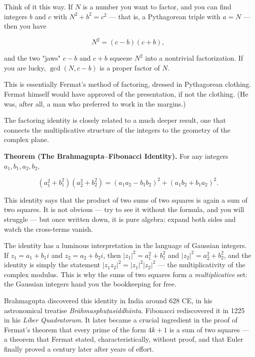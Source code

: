 Think of it this way. If $N$ is a number you want to factor, and you can find integers $b$ and $c$ with $N^2 + b^2 = c^2$ --- that is, a Pythagorean triple with $a = N$ --- then you have

\[N^2 = (c - b)(c + b),\]

and the two "jaws" $c - b$ and $c + b$ squeeze $N^2$ into a nontrivial factorization. If you are lucky, $\gcd(N, c - b)$ is a proper factor of $N$.

This is essentially Fermat's method of factoring, dressed in Pythagorean clothing. Fermat himself would have approved of the presentation, if not the clothing. (He was, after all, a man who preferred to work in the margins.)

The factoring identity is closely related to a much deeper result, one that connects the multiplicative structure of the integers to the geometry of the complex plane.

\textbf{Theorem (The Brahmagupta--Fibonacci Identity).} For any integers $a_1, b_1, a_2, b_2$,

\[(a_1^2 + b_1^2)(a_2^2 + b_2^2) = (a_1 a_2 - b_1 b_2)^2 + (a_1 b_2 + b_1 a_2)^2.\]

This identity says that the product of two sums of two squares is again a sum of two squares. It is not obvious --- try to see it without the formula, and you will struggle --- but once written down, it is pure algebra: expand both sides and watch the cross-terms vanish.

The identity has a luminous interpretation in the language of Gaussian integers. If $z_1 = a_1 + b_1 i$ and $z_2 = a_2 + b_2 i$, then $|z_1|^2 = a_1^2 + b_1^2$ and $|z_2|^2 = a_2^2 + b_2^2$, and the identity is simply the statement $|z_1 z_2|^2 = |z_1|^2 |z_2|^2$ --- the multiplicativity of the complex modulus. This is why the sums of two squares form a \textit{multiplicative} set: the Gaussian integers hand you the bookkeeping for free.

Brahmagupta discovered this identity in India around 628 CE, in his astronomical treatise \textit{Brāhmasphuṭasiddhānta}. Fibonacci rediscovered it in 1225 in his \textit{Liber Quadratorum}. It later became a crucial ingredient in the proof of Fermat's theorem that every prime of the form $4k + 1$ is a sum of two squares --- a theorem that Fermat stated, characteristically, without proof, and that Euler finally proved a century later after years of effort.

